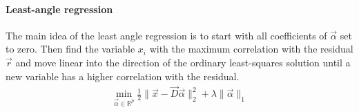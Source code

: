 \paragraph{Least-angle regression}
The main idea of the least angle regression is to start with all coefficients
of $\vec{\alpha}$ set to zero. Then find the variable $x_i$ with the maximum
correlation
with the residual $\vec{r}$ and move linear into the direction of the ordinary
least-squares solution until a new variable has a higher correlation with the
residual.  
\begin{align}
\min_{\vec{\alpha}\in\mathbb{R}^{p}}  \frac{1}{2} \lVert \vec{x} -
\vec{D}\vec{\alpha} \rVert^{2}_{2} + \lambda \lVert \vec{\alpha} \rVert_{1}
\end{align}

